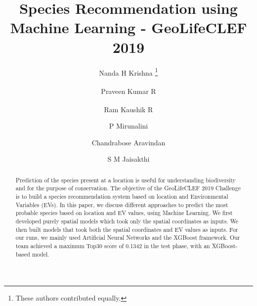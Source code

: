 \documentclass[runningheads]{llncs}
\makeatletter
\newcommand{\printfnsymbol}[1]{%
  \textsuperscript{\@fnsymbol{#1}}%
}
\makeatother
\begin{document}
\title{Species Recommendation using Machine Learning - GeoLifeCLEF 2019}

\author{Nanda H Krishna \thanks{These authors contributed equally.} \and Praveen Kumar R \printfnsymbol{1} \and
Ram Kaushik R \printfnsymbol{1} \and P Mirunalini  \and Chandrabose Aravindan  \and S M Jaisakthi }


{\let\thefootnote\relax{}}
\authorrunning{ }
\titlerunning{ }
\maketitle

\begin{abstract}
Prediction of the species present at a location is useful for understanding biodiversity and for the purpose of conservation. The objective of the GeoLifeCLEF 2019 Challenge is to build a species recommendation system based on location and Environmental Variables (EVs). In this paper, we discuss different approaches to predict the most probable species based on location and EV values, using Machine Learning. We first developed purely spatial models which took only the spatial coordinates as inputs. We then built models that took both the spatial coordinates and EV values as inputs. For our runs, we mainly used Artificial Neural Networks and the XGBoost framework. Our team achieved a maximum Top30 score of 0.1342 in the test phase, with an XGBoost-based model.

\end{abstract}
\end{document}
